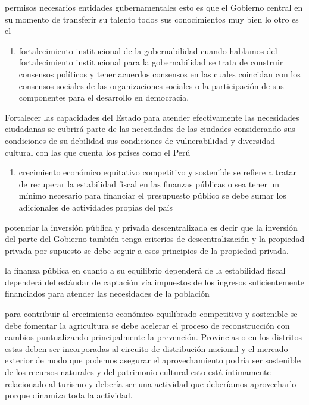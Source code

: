 \documentclass[
  letterpaper,
  DIV=11,
  numbers=noendperiod]{scrartcl}
\providecommand{\tightlist}{%
  \setlength{\itemsep}{0pt}\setlength{\parskip}{0pt}}\usepackage{longtable,booktabs,array}
\begin{document}
permisos necesarios entidades gubernamentales esto es que el Gobierno
central en su momento de transferir su talento todos sus conocimientos
muy bien lo otro es el

\begin{enumerate}
\def\labelenumi{\arabic{enumi}.}
\setcounter{enumi}{1}
\tightlist
\item
  fortalecimiento institucional de la gobernabilidad cuando hablamos del
  fortalecimiento institucional para la gobernabilidad se trata de
  construir consensos políticos y tener acuerdos consensos en las cuales
  coincidan con los consensos sociales de las organizaciones sociales o
  la participación de sus componentes para el desarrollo en democracia.
\end{enumerate}

Fortalecer las capacidades del Estado para atender efectivamente las
necesidades ciudadanas se cubrirá parte de las necesidades de las
ciudades considerando sus condiciones de su debilidad sus condiciones de
vulnerabilidad y diversidad cultural con las que cuenta los países como
el Perú

\begin{enumerate}
\def\labelenumi{\arabic{enumi}.}
\setcounter{enumi}{2}
\tightlist
\item
  crecimiento económico equitativo competitivo y sostenible se refiere a
  tratar de recuperar la estabilidad fiscal en las finanzas públicas o
  sea tener un mínimo necesario para financiar el presupuesto público se
  debe sumar los adicionales de actividades propias del país
\end{enumerate}

potenciar la inversión pública y privada descentralizada es decir que la
inversión del parte del Gobierno también tenga criterios de
descentralización y la propiedad privada por supuesto se debe seguir a
esos principios de la propiedad privada.

la finanza pública en cuanto a su equilibrio dependerá de la estabilidad
fiscal dependerá del estándar de captación vía impuestos de los ingresos
suficientemente financiados para atender las necesidades de la población

para contribuir al crecimiento económico equilibrado competitivo y
sostenible se debe fomentar la agricultura se debe acelerar el proceso
de reconstrucción con cambios puntualizando principalmente la
prevención. Provincias o en los distritos estas deben ser incorporadas
al circuito de distribución nacional y el mercado exterior de modo que
podemos asegurar el aprovechamiento podría ser sostenible de los
recursos naturales y del patrimonio cultural esto está íntimamente
relacionado al turismo y debería ser una actividad que deberíamos
aprovecharlo porque dinamiza toda la actividad.
\end{document}
